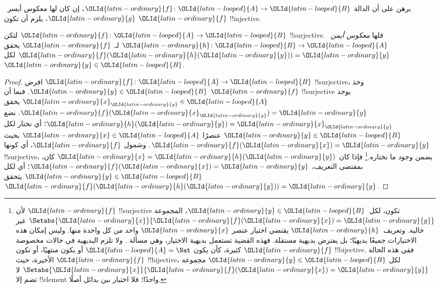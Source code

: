 \documentclass[../../../include/open-logic-section]{subfiles}
\begin{document}
\begin{prob}
برهن على أن الدالة $\OLId{latin-ordinary}{f}\colon \OLId{latin-looped}{A} \to \OLId{latin-looped}{B}$، إن كان لها معكوس أيسر~$\OLId{latin-ordinary}{g}$، يلزم
أن تكون $\OLId{latin-ordinary}{f}$ !!{injective}.
\end{prob}

\begin{prop}
لتكن $\OLId{latin-ordinary}{f}\colon \OLId{latin-looped}{A} \to \OLId{latin-looped}{B}$ !!{surjective}. فلها \emph{معكوس أيمن}~$\OLId{latin-ordinary}{h}\colon \OLId{latin-looped}{B} \to \OLId{latin-looped}{A}$
لـ~$\OLId{latin-ordinary}{f}$ يحقق $\OLId{latin-ordinary}{f}(\OLId{latin-ordinary}{h}(\OLId{latin-ordinary}{y})) = \OLId{latin-ordinary}{y}$ لكل~$\OLId{latin-ordinary}{y} \in \OLId{latin-looped}{B}$.
\end{prop}

\begin{proof}
افرض $\OLId{latin-ordinary}{f}\colon \OLId{latin-looped}{A} \to \OLId{latin-looped}{B}$ !!{surjective}، وخذ $\OLId{latin-ordinary}{y} \in \OLId{latin-looped}{B}$.
فبما أن $\OLId{latin-ordinary}{f}$ !!{surjective} يوجد $\OLId{latin-ordinary}{x}_\OLId{latin-ordinary}{y} \in \OLId{latin-looped}{A}$ يحقق $\OLId{latin-ordinary}{f}(\OLId{latin-ordinary}{x}_\OLId{latin-ordinary}{y}) = \OLId{latin-ordinary}{y}$.
نضع $\OLId{latin-ordinary}{h}(\OLId{latin-ordinary}{y}) = \OLId{latin-ordinary}{x}_\OLId{latin-ordinary}{y}$؛ أي نختار لكل $\OLId{latin-ordinary}{y} \in \OLId{latin-looped}{B}$ عنصرًا $\OLId{latin-ordinary}{x} \in \OLId{latin-looped}{A}$
بحيث $\OLId{latin-ordinary}{f}(\OLId{latin-ordinary}{x}) = \OLId{latin-ordinary}{y}$. وشمول $\OLId{latin-ordinary}{f}$، أي كونها !!{surjective}، يضمن
وجود ما نختاره.\footnote{لأن $\OLId{latin-ordinary}{f}$ !!{surjective} تكون، لكل~$\OLId{latin-ordinary}{y} \in \OLId{latin-looped}{B}$،
المجموعة $\Setabs{\OLId{latin-ordinary}{x}}{\OLId{latin-ordinary}{f}(\OLId{latin-ordinary}{x}) = \OLId{latin-ordinary}{y}}$ غير خالية. وتعريف~$\OLId{latin-ordinary}{h}$ يقتضي اختيار
عنصر $\OLId{latin-ordinary}{x}$ واحد من كل واحدة منها. وليس إمكان هذه الاختيارات جميعًا
بديهيًا؛ بل يفترض بديهية مستقلة. فهذه القضية تستعمل بديهية
الاختيار، وهي مسألة .
ولا تلزم البديهية في حالات مخصوصة كثيرة، كأن يكون $\OLId{latin-looped}{A} = \Nat$
أو يكون منتهيًا، أو تكون $\OLId{latin-ordinary}{f}$ !!{bijective}. ففي هذه الحالة
الأخيرة، حيث $\OLId{latin-ordinary}{f}$ !!{bijective}، لكل $\OLId{latin-ordinary}{y} \in \OLId{latin-looped}{B}$ مجموعة
$\Setabs{\OLId{latin-ordinary}{x}}{\OLId{latin-ordinary}{f}(\OLId{latin-ordinary}{x}) = \OLId{latin-ordinary}{y}}$ لا تضم إلا !!{element} واحدًا؛ فلا اختيار
بين بدائل أصلًا.}
فإذا كان $\OLId{latin-ordinary}{x} = \OLId{latin-ordinary}{h}(\OLId{latin-ordinary}{y})$ كان، بمقتضى التعريف، $\OLId{latin-ordinary}{f}(\OLId{latin-ordinary}{x}) = \OLId{latin-ordinary}{y}$؛ أي لكل
$\OLId{latin-ordinary}{y} \in \OLId{latin-looped}{B}$ يتحقق $\OLId{latin-ordinary}{f}(\OLId{latin-ordinary}{h}(\OLId{latin-ordinary}{y})) = \OLId{latin-ordinary}{y}$.
\end{proof}
\end{document}
